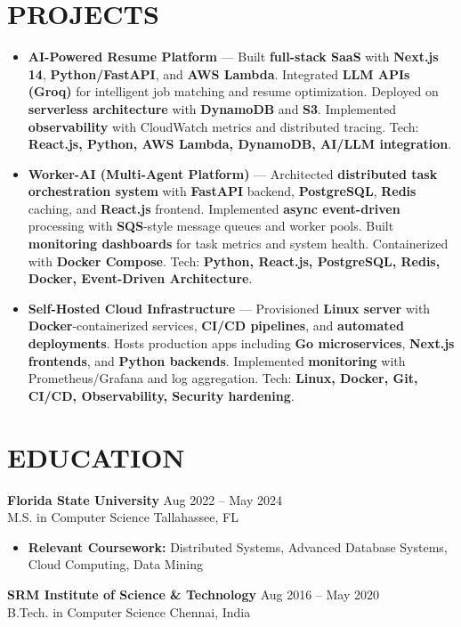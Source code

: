 \documentclass[letterpaper,10pt]{article}
\newcommand{\resumeItem}[1]{\item\small #1}
\newcommand{\resumeSubheading}[4]{
  \vspace{6pt}
  \noindent
  \textbf{#1} \hfill {\footnotesize #2} \\
  [-1pt]
  \noindent
  \small #3 \hfill {\small #4}
  \vspace{3pt}
}
\newcommand{\resumeItemsStart}{\vspace{-2pt}\begin{itemize}}
\newcommand{\resumeItemsEnd}{\end{itemize}\vspace{6pt}}
\begin{document}
\section{\textcolor{metablue}{PROJECTS}}
\vspace{-3pt}
\begin{tcolorbox}[colback=white,colframe=metablue,boxrule=0.8pt,arc=2pt,left=4pt,right=4pt,top=2pt,bottom=2pt,breakable]
\begin{itemize}
\resumeItem{\textbf{AI-Powered Resume Platform} --- Built \textbf{full-stack SaaS} with \textbf{Next.js 14}, \textbf{Python/FastAPI}, and \textbf{AWS Lambda}. Integrated \textbf{LLM APIs (Groq)} for intelligent job matching and resume optimization. Deployed on \textbf{serverless architecture} with \textbf{DynamoDB} and \textbf{S3}. Implemented \textbf{observability} with CloudWatch metrics and distributed tracing. Tech: \textbf{React.js, Python, AWS Lambda, DynamoDB, AI/LLM integration}.}

\resumeItem{\textbf{Worker-AI (Multi-Agent Platform)} --- Architected \textbf{distributed task orchestration system} with \textbf{FastAPI} backend, \textbf{PostgreSQL}, \textbf{Redis} caching, and \textbf{React.js} frontend. Implemented \textbf{async event-driven} processing with \textbf{SQS}-style message queues and worker pools. Built \textbf{monitoring dashboards} for task metrics and system health. Containerized with \textbf{Docker Compose}. Tech: \textbf{Python, React.js, PostgreSQL, Redis, Docker, Event-Driven Architecture}.}

\resumeItem{\textbf{Self-Hosted Cloud Infrastructure} --- Provisioned \textbf{Linux server} with \textbf{Docker}-containerized services, \textbf{CI/CD pipelines}, and \textbf{automated deployments}. Hosts production apps including \textbf{Go microservices}, \textbf{Next.js frontends}, and \textbf{Python backends}. Implemented \textbf{monitoring} with Prometheus/Grafana and log aggregation. Tech: \textbf{Linux, Docker, Git, CI/CD, Observability, Security hardening}.}

\end{itemize}
\end{tcolorbox}
\vspace{-5pt}


\section{\textcolor{metablue}{EDUCATION}}
\vspace{-10pt}
\resumeSubheading
{Florida State University}{Aug 2022 -- May 2024}
{M.S. in Computer Science}{Tallahassee, FL}
\resumeItemsStart
\resumeItem{\textbf{Relevant Coursework:} Distributed Systems, Advanced Database Systems, Cloud Computing, Data Mining}
\resumeItemsEnd
\vspace{-5pt}
\resumeSubheading
{SRM Institute of Science \& Technology}{Aug 2016 -- May 2020}
{B.Tech. in Computer Science}{Chennai, India}
\vspace{-10pt}
\end{document}
